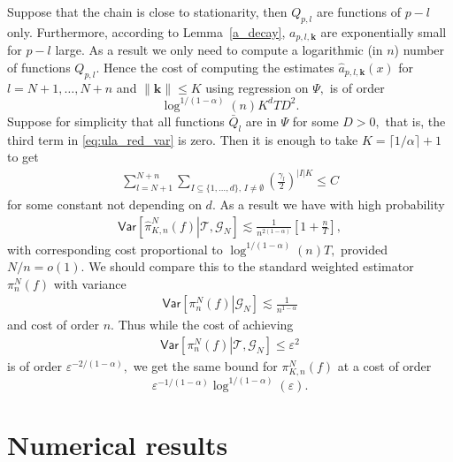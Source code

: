 \documentclass[article]{elsarticle}
\def\NtrainPath{T}
\def\TrainSet{\mathcal{T}}
\begin{document}
Suppose that the chain is close to stationarity, then \(Q_{p,l}\) are functions of \(p-l\) only.
Furthermore,  according to Lemma~\ref{a_decay}, \(a_{p,l,\mathbf{k}}\) are exponentially small for \(p-l\) large.
As a result we only need to compute a logarithmic (in \(n\)) number of functions \(Q_{p,l}.\)
Hence the cost of computing the estimates  \(\widehat {a}_{p,l,\mathbf{k}}(x)\) for \(l=N+1,\ldots,N+n\) and \(\|\mathbf{k}\|\leq K\) using regression on \(\Psi,\) is of order
\[
\log^{1/(1-\alpha)} (n) K^d  \NtrainPath D^2.
\]
Suppose for simplicity that all functions \(\bar{Q}_l\) are in \(\Psi\) for some \(D>0,\) that is, the third term in \eqref{eq:ula_red_var} is zero.  Then it is enough to take \(K=\lceil 1/\alpha \rceil+1\) to get
\begin{eqnarray*}
\sum_{l=N+1}^{N+n}\sum_{I\subseteq\{1,\ldots,d\},\, I\neq \emptyset}
\left(\frac{\gamma_{l}}{2}\right)^{|I|K}\leq C
\end{eqnarray*}
for some constant not depending on \(d.\) As a result we have with high probability
\begin{eqnarray*}
\mathsf{Var}\left[\left.\widehat \pi_{K,n}^N(f)\right | \TrainSet, \mathcal{G}_N\right]\lesssim \frac{1}{n^{2(1-\alpha)}}\left[1+\frac{n}{\NtrainPath}\right],
\end{eqnarray*}
with corresponding cost proportional to \(\log^{1/(1-\alpha)} (n) \NtrainPath,\) provided \(N/n=o(1).\) We should compare this to the standard weighted estimator \(\pi_{n}^N(f)\) with variance
\begin{eqnarray*}
\mathsf{Var}\left[\left. \pi_{n}^N(f)\right | \mathcal{G}_N\right]\lesssim \frac{1}{n^{1-\alpha}}
\end{eqnarray*}
and cost of order \(n.\) Thus while the cost of achieving
\begin{eqnarray*}
\mathsf{Var}\left[\left. \pi_{n}^N(f)\right | \TrainSet, \mathcal{G}_N\right]\leq \varepsilon^2
\end{eqnarray*}
is of order  \(\varepsilon^{-2/(1-\alpha)},\) we get the same bound for \(\pi_{K,n}^N(f)\) at a cost of order
\[
\varepsilon^{-1/(1-\alpha)}\log^{1/(1-\alpha)} (\varepsilon).
\]

\section{Numerical results}
\label{sec:num}
\end{document}

